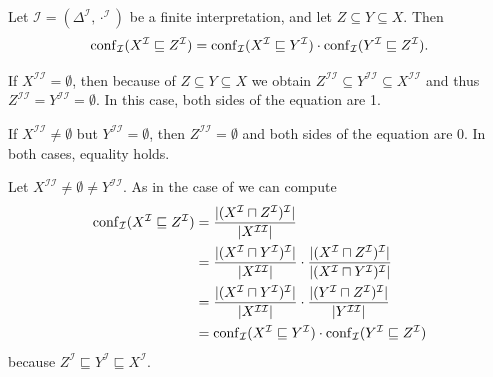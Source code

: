 \begin{Lemma}
  \label{lem:chain-rule-for-confidence-of-gcis}
  Let $\mathcal{I} = (\Delta^{\mathcal{I}}, \cdot^{\mathcal{I}})$ be a finite
  interpretation, and let $Z \subseteq Y \subseteq X$.  Then
  \begin{equation*}
    \operatorname{conf}_{\mathcal{I}}(X^{\mathcal{I}} \sqsubseteq Z^{\mathcal{I}}) =
    \operatorname{conf}_{\mathcal{I}}(X^{\mathcal{I}} \sqsubseteq Y^{\mathcal{I}}) \cdot
    \operatorname{conf}_{\mathcal{I}}(Y^{\mathcal{I}} \sqsubseteq Z^{\mathcal{I}}).
  \end{equation*}
\end{Lemma}
\begin{Proof}
  If $X^{\mathcal{I}\mathcal{I}} = \emptyset$, then because of $Z \subseteq Y \subseteq X$
  we obtain $Z^{\mathcal{I}\mathcal{I}} \subseteq Y^{\mathcal{I}\mathcal{I}} \subseteq
  X^{\mathcal{I}\mathcal{I}}$ and thus $Z^{\mathcal{I}\mathcal{I}} =
  Y^{\mathcal{I}\mathcal{I}} = \emptyset$.  In this case, both sides of the equation are
  1.

  If $X^{\mathcal{I}\mathcal{I}} \neq \emptyset$ but $Y^{\mathcal{I}\mathcal{I}} =
  \emptyset$, then $Z^{\mathcal{I}\mathcal{I}} = \emptyset$ and both sides of the equation
  are 0.  In both cases, equality holds.

  Let $X^{\mathcal{I}\mathcal{I}} \neq \emptyset \neq Y^{\mathcal{I}\mathcal{I}}$.  As in
  the case of  we can compute
  \begin{align*}
    \operatorname{conf}_{\mathcal{I}}(X^{\mathcal{I}} \sqsubseteq Z^{\mathcal{I}})
    &= \frac
    { \lvert (X^{\mathcal{I}} \sqcap Z^{\mathcal{I}})^{\mathcal{I}} \rvert}
    { \lvert X^{\mathcal{I}\mathcal{I}} \rvert} \\
    &= \frac
    { \lvert (X^{\mathcal{I}} \sqcap Y^{\mathcal{I}})^{\mathcal{I}} \rvert}
    { \lvert X^{\mathcal{I}\mathcal{I}} \rvert }
    \cdot \frac
    { \lvert (X^{\mathcal{I}} \sqcap Z^{\mathcal{I}})^{\mathcal{I}} \rvert}
    { \lvert (X^{\mathcal{I}} \sqcap Y^{\mathcal{I}})^{\mathcal{I}} \rvert} \\
    &= \frac
    { \lvert (X^{\mathcal{I}} \sqcap Y^{\mathcal{I}})^{\mathcal{I}} \rvert}
    { \lvert X^{\mathcal{I}\mathcal{I}} \rvert }
    \cdot \frac
    { \lvert (Y^{\mathcal{I}} \sqcap Z^{\mathcal{I}})^{\mathcal{I}} \rvert}
    { \lvert Y^{\mathcal{I}\mathcal{I}} \rvert} \\
    &= \operatorname{conf}_{\mathcal{I}}(X^{\mathcal{I}} \sqsubseteq Y^{\mathcal{I}}) \cdot
    \operatorname{conf}_{\mathcal{I}}(Y^{\mathcal{I}} \sqsubseteq Z^{\mathcal{I}})
  \end{align*}
  because $Z^{\mathcal{I}} \sqsubseteq Y^{\mathcal{I}} \sqsubseteq X^{\mathcal{I}}$.
\end{Proof}

